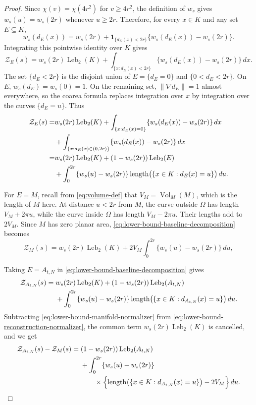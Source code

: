 \documentclass{article}
\newcommand{\Vol}{\operatorname{Vol}}
\newcommand{\Leb}{\operatorname{Leb}}
\numberwithin{equation}{section}
\begin{document}
\begin{proof}
Since $\chi(v)=\chi(4r^2)$ for $v\ge4r^2$, the definition of $w_s$ gives
$w_s(u)=w_s(2r)$ whenever $u\ge2r$. Therefore, for every $x\in K$ and any set $E \subseteq K$,
\[
 w_s(d_E(x))
 =w_s(2r)
 +\mathbf 1_{\{d_E(x)<2r\}}
  \{w_s(d_E(x))-w_s(2r)\}.
\]
Integrating this pointwise identity over $K$ gives
\[
 \mathcal Z_E(s)
 =w_s(2r)\Leb_2(K)
 +\int_{\{x:d_E(x)<2r\}}
   \{w_s(d_E(x))-w_s(2r)\}\,dx.
\]
The set $\{d_E<2r\}$ is the disjoint union of
$E=\{d_E=0\}$ and $\{0<d_E<2r\}$. On $E$, $w_s(d_E)=w_s(0)=1$.
On the remaining set, $\lVert\nabla d_E\rVert=1$ almost everywhere, so
the coarea formula \citep[Theorem 3.2.22]{federer1969geometric} replaces integration over $x$ by integration over the
curves $\{d_E=u\}$. Thus
\begin{align}
 \mathcal Z_E(s)=&w_s(2r)\Leb_2(K)
 +\int_{\{x:d_E(x)=0\}}
   \{w_s(d_E(x))-w_s(2r)\}\,dx \\
  &+ \int_{\{x:d_E(x)\in(0,2r)\}}
   \{w_s(d_E(x))-w_s(2r)\}\,dx  \\
 =&w_s(2r)\Leb_2(K)
 +(1-w_s(2r))\Leb_2(E)\notag\\
 &+\int_0^{2r}\{w_s(u)-w_s(2r)\}
   \operatorname{length}\bigl(\{x\in K:d_E(x)=u\}\bigr)\,du.
\label{eq:lower-bound-baseline-decomposition}
\end{align}


For $E=M$, recall from \eqref{eq:volume-def} that
$V_M=\Vol_M(M)$, which is the length of $M$ here. At distance $u<2r$
from $M$, the curve outside $\Omega$ has length $V_M+2\pi u$, while the
curve inside $\Omega$ has length $V_M-2\pi u$. Their lengths add to $2V_M$.
Since $M$ has zero planar area,
\eqref{eq:lower-bound-baseline-decomposition} becomes
\begin{equation}
 \mathcal Z_M(s)
 =w_s(2r)\Leb_2(K)
  +2V_M\int_0^{2r}\{w_s(u)-w_s(2r)\}\,du,
\label{eq:lower-bound-manifold-normalizer}
\end{equation}

Taking $E=A_{t,N}$ in
\eqref{eq:lower-bound-baseline-decomposition} gives
\begin{align}
 \mathcal Z_{A_{t,N}}(s)
 ={}&w_s(2r)\Leb_2(K)
 +(1-w_s(2r))\Leb_2(A_{t,N})\notag\\
 &+\int_0^{2r}\{w_s(u)-w_s(2r)\}
 \operatorname{length}\bigl(\{x\in K:d_{A_{t,N}}(x)=u\}\bigr)\,du.
\label{eq:lower-bound-reconstruction-normalizer}
\end{align}
Subtracting \eqref{eq:lower-bound-manifold-normalizer} from
\eqref{eq:lower-bound-reconstruction-normalizer}, the common term $w_s(2r)\Leb_2(K)$ is cancelled, and we get
\begin{align}
 \mathcal Z_{A_{t,N}}(s)-\mathcal Z_M(s)
 ={}&(1-w_s(2r))\Leb_2(A_{t,N})\notag\\
 &+\int_0^{2r}\{w_s(u)-w_s(2r)\}\notag\\
 &\qquad\times
 \Bigl\{\operatorname{length}
 \bigl(\{x\in K:d_{A_{t,N}}(x)=u\}\bigr)-2V_M\Bigr\}\,du.
\label{eq:lower-bound-normalizer-exact-difference}
\end{align}


\end{proof}
\end{document}
